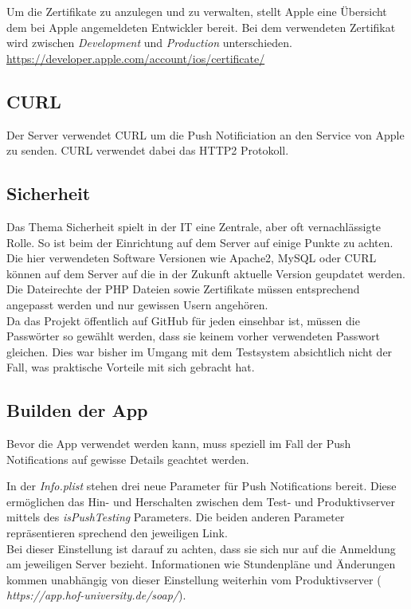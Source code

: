 Um die Zertifikate zu anzulegen und zu verwalten, stellt Apple eine Übersicht dem bei Apple angemeldeten Entwickler bereit. Bei dem verwendeten Zertifikat wird zwischen \textit{Development} und \textit{Production} unterschieden.\\
\url{https://developer.apple.com/account/ios/certificate/}


\subsection{CURL}
Der Server verwendet CURL um die Push Notificiation an den Service von Apple zu senden.  
CURL verwendet dabei das HTTP2 Protokoll.

\textcolor{black}{

}


\subsection{Sicherheit}
Das Thema Sicherheit spielt in der IT eine Zentrale, aber oft vernachlässigte Rolle. So ist beim der Einrichtung auf dem Server auf einige Punkte zu achten. Die hier verwendeten Software Versionen wie Apache2, MySQL oder CURL können auf dem Server auf die in der Zukunft aktuelle Version geupdatet werden.
Die Dateirechte der PHP Dateien sowie Zertifikate müssen entsprechend angepasst werden und nur gewissen Usern angehören.\\
Da das Projekt öffentlich auf GitHub für jeden einsehbar ist, müssen die Passwörter so gewählt werden, dass sie keinem vorher verwendeten Passwort gleichen. Dies war bisher im Umgang mit dem Testsystem absichtlich nicht der Fall, was praktische Vorteile mit sich gebracht hat.


\subsection{Builden der App}
Bevor die App verwendet werden kann, muss speziell im Fall der Push Notifications auf gewisse Details geachtet werden.


In der \textit{Info.plist} stehen drei neue Parameter für Push Notifications bereit. Diese ermöglichen das Hin- und Herschalten zwischen dem Test- und Produktivserver mittels des \textit{isPushTesting} Parameters. Die beiden anderen Parameter repräsentieren sprechend den jeweiligen Link.\\
Bei dieser Einstellung ist darauf zu achten, dass sie sich nur auf die Anmeldung am jeweiligen Server bezieht. Informationen wie Stundenpläne und Änderungen kommen unabhängig von dieser Einstellung weiterhin vom Produktivserver (\textit{ https://app.hof-university.de/soap/}).

